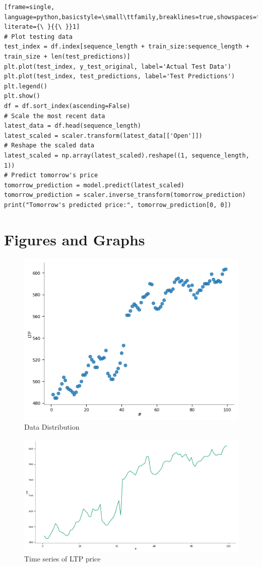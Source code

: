 \documentclass[./main.tex]{subfiles}
\begin{document}
\begin{lstlisting}[frame=single, language=python,basicstyle=\small\ttfamily,breaklines=true,showspaces=false,columns=fullflexible, literate={\ }{{\ }}1]
# Plot testing data
test_index = df.index[sequence_length + train_size:sequence_length + train_size + len(test_predictions)]
plt.plot(test_index, y_test_original, label='Actual Test Data')
plt.plot(test_index, test_predictions, label='Test Predictions')
plt.legend()
plt.show()
df = df.sort_index(ascending=False)
# Scale the most recent data
latest_data = df.head(sequence_length)
latest_scaled = scaler.transform(latest_data[['Open']])
# Reshape the scaled data
latest_scaled = np.array(latest_scaled).reshape((1, sequence_length, 1))
# Predict tomorrow's price
tomorrow_prediction = model.predict(latest_scaled)
tomorrow_prediction = scaler.inverse_transform(tomorrow_prediction)
print("Tomorrow's predicted price:", tomorrow_prediction[0, 0])
\end{lstlisting}
\section*{Figures and Graphs}
\begin{figure}[H]
    \centering
    \includegraphics[width=1\linewidth]{images/distribution.png}
    \caption{Data Distribution}
    \label{fig:7.1}
\end{figure}
\newpage
\begin{figure}[H]
    \centering
    \includegraphics[width=1\linewidth]{images/raw-data-time-series.png}
    \caption{Time series of LTP price}
    \label{fig:7.2}
\end{figure}
\end{document}
